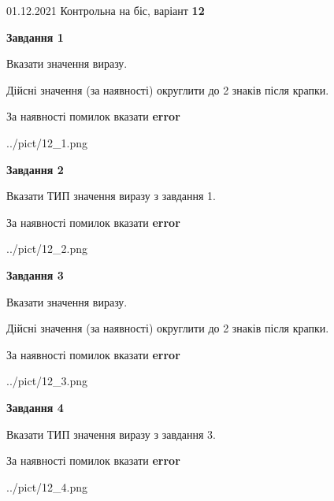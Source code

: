 \documentclass[11pt, ukrainian]{article}
\begin{document}
{01.12.2021 Контрольна на біс, варіант  \No \textbf { 12 }\par}
{
\begin {large}
{\begin {center}\textbf{Завдання 1}\end {center}}\par
Вказати значення виразу. \par
Дійсні значення (за наявності) округлити до 2 знаків після крапки. \par
За наявності помилок вказати \textbf{error}

\begin{center}
	{../pict/12_1.png}
\end{center}
\newpage

{\begin {center}\textbf{Завдання 2}\end {center}}\par
Вказати ТИП значення виразу з завдання 1. \par
За наявності помилок вказати \textbf{error}

\begin{center}
	{../pict/12_2.png}
\end{center}
\newpage

{\begin {center}\textbf{Завдання 3}\end {center}}\par
Вказати значення виразу. \par
Дійсні значення (за наявності) округлити до 2 знаків після крапки. \par
За наявності помилок вказати \textbf{error}

\begin{center}
	{../pict/12_3.png}
\end{center}
\newpage

{\begin {center}\textbf{Завдання 4}\end {center}}\par
Вказати ТИП значення виразу з завдання 3. \par
За наявності помилок вказати \textbf{error}

\begin{center}
	{../pict/12_4.png}
\end{center}
\newpage


\end{large}}
\end{document}
